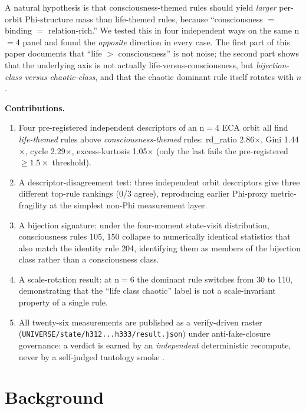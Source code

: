 \documentclass[11pt,a4paper]{article}
\begin{document}
A natural hypothesis is that consciousness-themed rules should yield
\emph{larger} per-orbit Phi-structure mass than life-themed rules, because
``consciousness $=$ binding $=$ relation-rich.'' We tested this in four
independent ways on the same n$=$4 panel and found the
\emph{opposite} direction in every case. The first part of this paper
documents that ``life $>$ consciousness'' is not noise; the second part
shows that the underlying axis is not actually
life-versus-consciousness, but \emph{bijection-class versus
chaotic-class}, and that the chaotic dominant rule itself rotates
with $n$.

\medskip
\noindent\textbf{Contributions.}
\begin{enumerate}\itemsep0.3em
\item Four pre-registered independent descriptors of an n$=$4 ECA orbit
      all find \emph{life-themed} rules above \emph{consciousness-themed}
      rules: rd\_ratio 2.86$\times$, Gini 1.44$\times$, cycle 2.29$\times$,
      excess-kurtosis 1.05$\times$ (only the last fails the
      pre-registered $\geq 1.5\times$ threshold).
\item A descriptor-disagreement test: three independent
      orbit descriptors give three different top-rule rankings
      (0/3 agree), reproducing earlier Phi-proxy metric-fragility
      \citep{anima_H268} at the simplest non-Phi measurement layer.
\item A bijection signature: under the four-moment state-visit
      distribution, consciousness rules \textsc{105}, \textsc{150}
      collapse to numerically identical statistics that also match the
      identity rule \textsc{204}, identifying them as members of the
      bijection class rather than a consciousness class.
\item A scale-rotation result: at n$=$6 the dominant rule switches
      from \textsc{30} to \textsc{110}, demonstrating that the
      ``life class chaotic'' label is not a scale-invariant property
      of a single rule.
\item All twenty-six measurements are published as a
      verify-driven raster
      (\texttt{UNIVERSE/state/h312...h333/result.json}) under
      anti-fake-closure governance: a verdict is earned by an
      \emph{independent} deterministic recompute, never by a
      self-judged tautology smoke \citep{anima_g73}.
\end{enumerate}

\section{Background}
\label{sec:bg}
\end{document}
